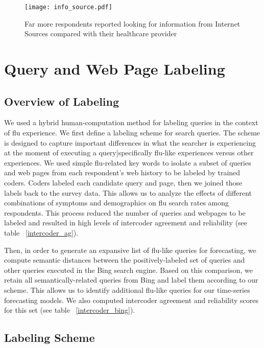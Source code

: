 \documentclass[12pt]{article}
\begin{document}
\begin{figure}[!htbp]
\begin{centering}
   \texttt{[image: info\_source.pdf]}
  \caption{Far more respondents reported looking for information from Internet Sources compared with their healthcare provider}
\label{info_source}
\end{centering}
\end{figure}


\section{Query and Web Page Labeling}

\subsection{Overview of Labeling}
We used a hybrid human-computation method for labeling queries in the context of flu experience. We first define a labeling scheme for search queries. The scheme is designed to capture important differences in what the searcher is experiencing at the moment of executing a query|specifically flu-like experiences versus other experiences. 
We used simple flu-related key words to isolate a subset of queries and web pages from each respondent's web history to be labeled by trained coders. Coders labeled each candidate query and page, then we joined those labels back to the survey data. This allows us to analyze the effects of different combinations of symptoms and demographics on flu search rates among respondents. This process reduced the number of queries and webpages to be labeled and resulted in high levels of intercoder agreement and reliability (see table ~\ref{intercoder_ag}).

Then, in order to generate an expansive list of flu-like queries for forecasting, we compute semantic distances between the positively-labeled set of queries and other queries executed in the Bing search engine. Based on this comparison, we retain all semantically-related queries from Bing and label them according to our scheme. This allows us to identify additional flu-like queries for our time-series forecasting models. We also computed intercoder agreement and reliability scores for this set (see table ~\ref{intercoder_bing}). 

\subsection{Labeling Scheme}
\end{document}
